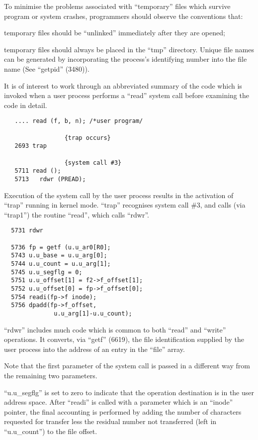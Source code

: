 To minimise the problems associated
with ``temporary'' files which survive
program or system crashes, programmers
should observe the conventions that:

\bd
\item[(a)] temporary files should be
 ``unlinked'' immediately after
 they are opened;

\item[(b)] temporary files should always be
 placed in the ``tmp'' directory.
 Unique file names can be generated by incorporating the
 process's identifying number into the file name (See ``getpid''
 (3480)).
\ed


It is of interest to work through an
abbreviated summary of the code which
is invoked when a user process performs
a ``read'' system call before examining
the code in detail.

\begin{verbatim}
   .... read (f, b, n); /*user program/

                 {trap occurs}
   2693 trap

                 {system call #3}
   5711 read ();
   5713   rdwr (PREAD);
\end{verbatim}



Execution of the system call by the
user process results in the activation
of ``trap'' running in kernel mode.
``trap'' recognises system call \#3, and
calls (via ``trap1'') the routine ``read'',
which calls ``rdwr''.

\begin{verbatim}
  5731 rdwr

  5736 fp = getf (u.u_ar0[R0];
  5743 u.u_base = u.u_arg[0];
  5744 u.u_count = u.u_arg[1];
  5745 u.u_segflg = 0;
  5751 u.u_offset[1] = f2->f_offset[1];
  5752 u.u_offset[0] = fp->f_offset[0];
  5754 readi(fp->f inode);
  5756 dpadd(fp->f_offset,
              u.u_arg[1]-u.u_count);
\end{verbatim}

``rdwr'' includes much code which is common to both ``read'' and ``write'' operations. It converts, via ``getf'' (6619),
the file identification supplied by the
user process into the address of an
entry in the ``file'' array.

Note that the first parameter of the
system call is passed in a different
way from the remaining two parameters.


``u.u\_segflg'' is set to zero to indicate
that the operation destination is in
the user address space. After ``readi''
is called with a parameter which is an
``inode'' pointer, the final accounting
is performed by adding the number of
characters requested for transfer less
the residual number not transferred
(left in ``u.u\_count'') to the file
offset.

